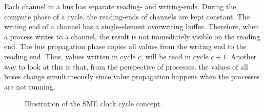 Each channel in a bus has separate reading- and writing-ends. During the compute
phase of a cycle, the reading-ends of channels are kept constant. The writing
end of a channel has a single-element overwriting buffer. Therefore, when a
process writes to a channel, the result is not immediately visible on the
reading end. The bus propagation phase copies all values from the writing end to
the reading end. Thus, values written in cycle $c$, will be read in cycle
$c+1$. Another way to look at this is that, from the perspective of processes,
the values of all buses change simultaneously since value propagation happens
when the processes are not running.%


\begin{figure}
  \centering
{}
\caption{Illustration of the SME clock cycle concept.}
\label{fig:smeclock}
\end{figure}






